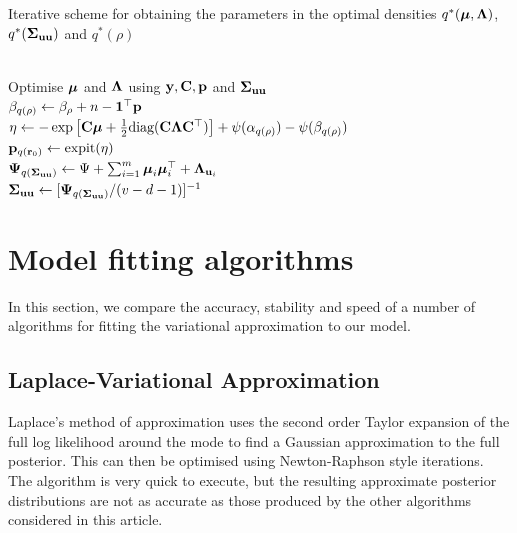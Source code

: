 \documentclass{article}[12pt]
\begin{document}
\begin{algorithm}
\caption[Algorithm 1]{Iterative scheme for obtaining the parameters in the
optimal densities $q^*({\boldsymbol \mu}, {\boldsymbol \Lambda})$, $q^*({\boldsymbol \Sigma}_{{\bf u} {\bf u}})$ and $q^*(\rho)$}
\label{alg:algorithm_one}
\begin{algorithmic}
 \\[1ex]
\STATE Optimise ${\boldsymbol \mu}$ and ${\boldsymbol \Lambda}$ using ${\bf y}, {\bf C}, {\bf p}$ and ${\boldsymbol \Sigma}_{{\bf u} {\bf u}}$ \\[1ex]
\STATE $\beta_{q(\rho)} \leftarrow \beta_\rho + n - {\bf 1}^\top{\bf p}$ \\[1ex]
\STATE $\eta \leftarrow -\exp \left [ {\bf C} {\boldsymbol \mu} + {\frac{1}{2}} \text{diag}{({\bf C}{\boldsymbol\Lambda}{\bf C}^\top)} \right ] + \psi{(\alpha_{q{(\rho)}})} - \psi{(\beta_{q{(\rho)}})}$ \\[1ex]
\STATE ${\bf p}_{q({\bf r}_0)} \leftarrow \text{expit} (\eta)$ \\[1ex]
\STATE ${\boldsymbol \Psi}_{q({\boldsymbol \Sigma}_{{\bf u} {\bf u}})} \leftarrow \Psi + \sum_{i=1}^m {\boldsymbol \mu}_i {\boldsymbol \mu}_i^\top + {\boldsymbol \Lambda}_{{{\bf u}}_i}$ \\[1ex]
\STATE ${\boldsymbol \Sigma}_{{\bf u}{\bf u}} \leftarrow [{\boldsymbol \Psi}_{q({\boldsymbol \Sigma}_{{\bf u} {\bf u}})}/(v - d - 1)]^{-1}$
\ENDWHILE
\end{algorithmic}
\end{algorithm}

\section{Model fitting algorithms}
\label{sec:algorithms}

In this section, we compare the accuracy, stability and speed of a number of algorithms for fitting the 
variational approximation to our model.

\subsection{Laplace-Variational Approximation}
Laplace's method of approximation uses the second order Taylor expansion of the
full log likelihood around the mode to find a Gaussian approximation to the full posterior.
This can then be optimised using Newton-Raphson style iterations. The algorithm is very
quick to execute, but the resulting approximate posterior distributions are not as accurate
as those produced by the other algorithms considered in this article.
\end{document}

